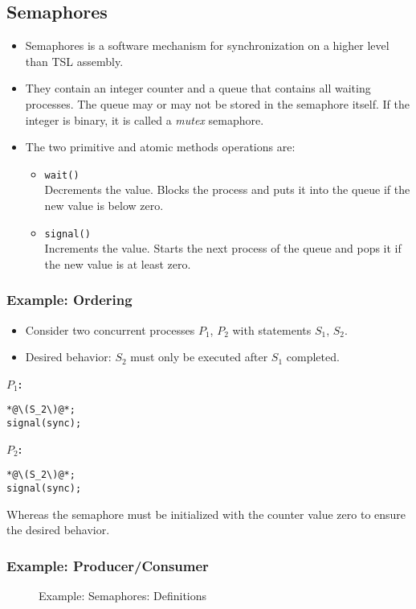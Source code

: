 		\subsection{Semaphores}
			\begin{itemize}
				\item Semaphores is a software mechanism for synchronization on a higher level than TSL assembly.
				\item They contain an integer counter and a queue that contains all waiting processes. The queue may or may not be stored in the semaphore itself. If the integer is binary, it is called a \textit{mutex} semaphore.
				\item The two primitive and atomic methods operations are:
					\begin{itemize}
						\item \texttt{wait()} \\ Decrements the value. Blocks the process and puts it into the queue if the new value is below zero.
						\item \texttt{signal()} \\ Increments the value. Starts the next process of the queue and pops it if the new value is at least zero.
					\end{itemize}
			\end{itemize}

			\subsubsection{Example: Ordering}
				\begin{itemize}
					\item Consider two concurrent processes \(P_1\), \(P_2\) with statements \(S_1\), \(S_2\).
					\item Desired behavior: \(S_2\) must only be executed after \(S_1\) completed.
				\end{itemize}

				\textbf{\(P_1\):}
				\begin{lstlisting}
*@\(S_2\)@*;
signal(sync);
\end{lstlisting}

				\textbf{\(P_2\):}
				\begin{lstlisting}
*@\(S_2\)@*;
signal(sync);
\end{lstlisting}

				Whereas the semaphore must be initialized with the counter value zero to ensure the desired behavior.

			\subsubsection{Example: Producer/Consumer}
				\begin{figure}[H]
					\centering
					
					\caption{Example: Semaphores: Definitions}
				\end{figure}

